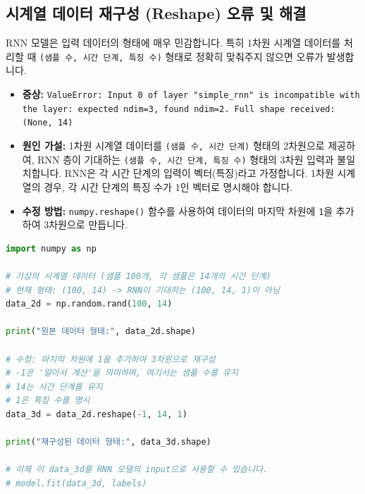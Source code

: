 \documentclass[11pt,a4paper]{article}
\theoremstyle{definition}
\begin{document}
\subsection{시계열 데이터 재구성 (Reshape) 오류 및 해결}
RNN 모델은 입력 데이터의 형태에 매우 민감합니다. 특히 1차원 시계열 데이터를 처리할 때 \texttt{(샘플 수, 시간 단계, 특징 수)} 형태로 정확히 맞춰주지 않으면 오류가 발생합니다.

\begin{itemize}
    \item \textbf{증상:} \texttt{ValueError: Input 0 of layer "simple_rnn" is incompatible with the layer: expected ndim=3, found ndim=2. Full shape received: (None, 14)}
    \item \textbf{원인 가설:} 1차원 시계열 데이터를 \texttt{(샘플 수, 시간 단계)} 형태의 2차원으로 제공하여, RNN 층이 기대하는 \texttt{(샘플 수, 시간 단계, 특징 수)} 형태의 3차원 입력과 불일치합니다. RNN은 각 시간 단계의 입력이 벡터(특징)라고 가정합니다. 1차원 시계열의 경우, 각 시간 단계의 특징 수가 1인 벡터로 명시해야 합니다.
    \item \textbf{수정 방법:} \texttt{numpy.reshape()} 함수를 사용하여 데이터의 마지막 차원에 \texttt{1}을 추가하여 3차원으로 만듭니다.
\end{itemize}

\begin{lstlisting}[language=Python, caption=시계열 데이터 재구성 예시, label=lst:reshape_fix]
import numpy as np

# 가상의 시계열 데이터 (샘플 100개, 각 샘플은 14개의 시간 단계)
# 현재 형태: (100, 14) -> RNN이 기대하는 (100, 14, 1)이 아님
data_2d = np.random.rand(100, 14) 

print("원본 데이터 형태:", data_2d.shape)

# 수정: 마지막 차원에 1을 추가하여 3차원으로 재구성
# -1은 '알아서 계산'을 의미하며, 여기서는 샘플 수를 유지
# 14는 시간 단계를 유지
# 1은 특징 수를 명시
data_3d = data_2d.reshape(-1, 14, 1) 

print("재구성된 데이터 형태:", data_3d.shape)

# 이제 이 data_3d를 RNN 모델의 input으로 사용할 수 있습니다.
# model.fit(data_3d, labels)
\end{lstlisting}
\end{document}
